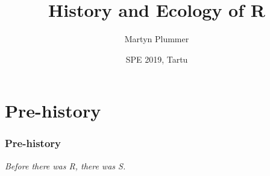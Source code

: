 \documentclass[svgnames]{beamer}
\title[R history] %
{History and Ecology of R}
\subtitle
{} %
\author %
{Martyn Plummer}
\institute[IARC] %
{
  University of Warwick, UK
}
\date %
{SPE 2019, Tartu}
\begin{document}
\begin{frame}[plain]
  \titlepage
\end{frame}





\section{Pre-history}

\begin{frame}
  \frametitle{Pre-history}

  \begin{center}
  {\em Before there was R, there was S.}
  \end{center}
  
\end{frame}
\end{document}

